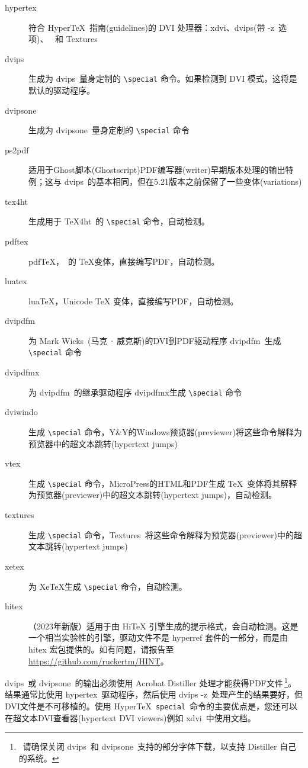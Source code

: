 \documentclass{article}
\newcommand*{\xpackage}[1]{\textsf{#1}}
\newcommand{\bs}{\symbol{'134}}%
\newcommand{\ci}[1]{\texttt{\bs#1}}
\begin{document}
\begin{description}
  \item[hypertex] 符合 Hyper\TeX\ 指南(guidelines)的 DVI 处理器：\textsf{xdvi}、\textsf{dvips}(带 \textsf{-z}\ 选项)、 \textsf{}\ 和 \textsf{Textures}
  \item[dvips] 生成为 \textsf{dvips}\ 量身定制的 \verb|\special| 命令。如果检测到 DVI 模式，这将是默认的驱动程序。
  \item[dvipsone] 生成为 \textsf{dvipsone}\ 量身定制的 \verb|\special| 命令
  \item[ps2pdf] 适用于Ghost脚本(Ghost\-script)PDF编写器(writer)早期版本处理的输出特例；这与 \textsf{dvips}\ 的基本相同，但在5.21版本之前保留了一些变体(variations)
  \item[tex4ht] 生成用于 \textsf{\TeX4ht}\ 的 \verb|\special| 命令，自动检测。
  \item[pdftex] pdf\TeX，\ 的 \TeX{}变体，直接编写PDF，自动检测。
  \item[luatex] lua\TeX，Unicode \TeX{} 变体，直接编写PDF，自动检测。
  \item[dvipdfm] 为 Mark Wicks~(马克\,·\,威克斯)的DVI到PDF驱动程序 \textsf{dvipdfm}\ 生成 \verb|\special| 命令
  \item[dvipdfmx] 为 \textsf{dvipdfm}\ 的继承驱动程序 \textsf{dvipdfmx}生成 \verb|\special| 命令
  \item[dviwindo] 生成 \verb|\special| 命令，Y\&Y的Windows预览器(previewer)将这些命令解释为预览器中的超文本跳转(hypertext jumps)
  \item[vtex] 生成 \verb|\special| 命令，MicroPress的HTML和PDF生成 \TeX\ 变体将其解释为预览器(previewer)中的超文本跳转(hypertext jumps)，自动检测。
  \item[textures] 生成 \verb|\special| 命令，\textsf{Textures}\ 将这些命令解释为预览器(previewer)中的超文本跳转(hypertext jumps)
  \item[xetex] 为 Xe\TeX{}生成 \verb|\special| 命令，自动检测。
  \item[hitex]（2023年新版）适用于由 Hi\TeX{} 引擎生成的提示格式，会自动检测。这是一个相当实验性的引擎，驱动文件不是 \xpackage{hyperref} 套件的一部分，而是由 \xpackage{hitex} 宏包提供的。如有问题，请报告至 \url{https://github.com/ruckertm/HINT}。
\end{description}

\textsf{dvips}\ 或 \textsf{dvipsone}\ 的输出必须使用 Acrobat Distiller 处理才能获得PDF文件\,\footnote{\ 请确保关闭 \textsf{dvips}\ 和 \textsf{dvipsone}\ 支持的部分字体下载，以支持 Distiller 自己的系统。}。结果通常比使用 \textsf{hypertex}\ 驱动程序，然后使用 \textsf{dvips -z}\ 处理产生的结果要好，但DVI文件是不可移植的。使用 Hyper\TeX\ \ci{special}\ 命令的主要优点是，您还可以在超文本DVI查看器(hypertext DVI viewers)例如 \textsf{xdvi}\ 中使用文档。
\end{document}
